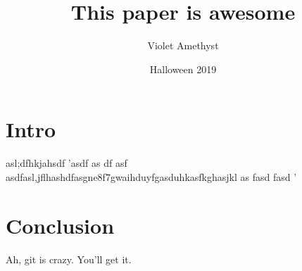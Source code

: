 \documentclass{article}
\title{This paper is awesome}
\date{Halloween 2019}
\author{Violet Amethyst}
\begin{document}
\maketitle


\section{Intro}

asl;dfhkjahsdf
'asdf
as
df
asf
asdfasl,jflhashdfasgne8f7gwaihduyfgasduhkasfkghasjkl
as
fasd
fasd
'

\section{Conclusion}

Ah, git is crazy.  You'll get it.
\end{document}
